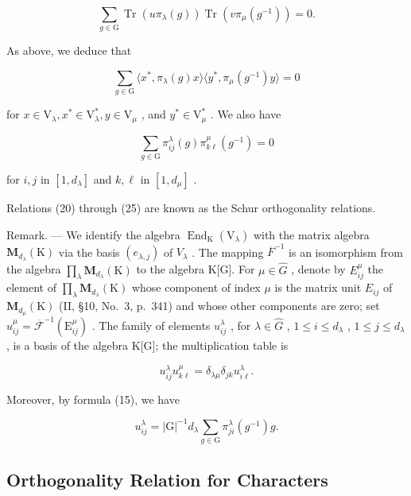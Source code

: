 \[
\sum_ {g \in \mathrm{G}} \operatorname{Tr} (u \pi_ {\lambda} (g)) \operatorname{Tr} (v \pi_ {\mu} (g ^ {- 1})) = 0.\tag{23}
\]

As above, we deduce that

\[
\sum_ {g \in \mathrm{G}} \langle x ^ {*}, \pi_ {\lambda} (g) x \rangle \langle y ^ {*}, \pi_ {\mu} (g ^ {- 1}) y \rangle = 0\tag{24}
\]

for \(x\in \mathrm{V}_{\lambda},x^{*}\in \mathrm{V}_{\lambda}^{*},y\in \mathrm{V}_{\mu}\) , and \(y^{*}\in \mathrm{V}_{\mu}^{*}\) . We also have

\[
\sum_ {g \in \mathrm{G}} \pi_ {i j} ^ {\lambda} (g) \pi_ {k \ell} ^ {\mu} (g ^ {- 1}) = 0\tag{25}
\]

for \(i,j\) in \([1,d_{\lambda}]\) and \(k,\ell\) in \([1,d_{\mu}]\) .

Relations (20) through (25) are known as the Schur orthogonality relations.

Remark. --- We identify the algebra \(\operatorname{End}_{\mathrm{K}}(\mathrm{V}_{\lambda})\) with the matrix algebra \(\mathbf{M}_{d_{\lambda}}(\mathrm{K})\) via the basis \((e_{\lambda,j})\) of \(V_{\lambda}\) . The mapping \(\overline{F}^{-1}\) is an isomorphism from the algebra \(\prod_{\lambda}\mathbf{M}_{d_{\lambda}}(\mathrm{K})\) to the algebra K{[}G{]}. For \(\mu\in\widehat{G}\) , denote by \(E_{ij}^{\mu}\) the element of \(\prod_{\lambda}\mathbf{M}_{d_{\lambda}}(\mathrm{K})\) whose component of index \(\mu\) is the matrix unit \(E_{ij}\) of \(\mathbf{M}_{d_{\mu}}(\mathrm{K})\) (II, §10, No.~3, p.~341) and whose other components are zero; set \(u_{ij}^{\mu}=\overline{\mathcal{F}}^{-1}(\mathrm{E}_{ij}^{\mu})\) . The family of elements \(u_{ij}^{\lambda}\) , for \(\lambda\in\widehat{G}\) , \(1\leqslant i\leqslant d_{\lambda}\) , \(1\leqslant j\leqslant d_{\lambda}\) , is a basis of the algebra K{[}G{]}; the multiplication table is

\[
u _ {i j} ^ {\lambda} u _ {k \ell} ^ {\mu} = \delta_ {\lambda \mu} \delta_ {j k} u _ {i \ell} ^ {\lambda}.\tag{26}
\]

Moreover, by formula (15), we have

\[
u _ {i j} ^ {\lambda} = | \mathrm{G} | ^ {- 1} d _ {\lambda} \sum_ {g \in \mathrm{G}} \pi_ {j i} ^ {\lambda} (g ^ {- 1}) g.\tag{27}
\]

\subsection{Orthogonality Relation for Characters}

